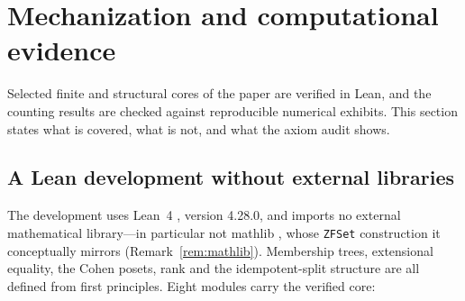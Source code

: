 \section{Mechanization and computational evidence}\label{sec:mech}

Selected finite and structural cores of the paper are verified in Lean, and the counting results
are checked against reproducible numerical exhibits. This section states what is covered, what is
not, and what the axiom audit shows.

\subsection{A Lean development without external libraries}

The development uses Lean~4 \citep{deMouraUllrich2021}, version 4.28.0, and imports no external
mathematical library---in particular not \textsf{mathlib} \citep{Mathlib2020}, whose
\texttt{ZFSet} construction it conceptually mirrors (Remark~\ref{rem:mathlib}). Membership trees,
extensional equality, the Cohen posets, rank and the idempotent-split structure are all defined
from first principles. Eight modules carry the verified core:
